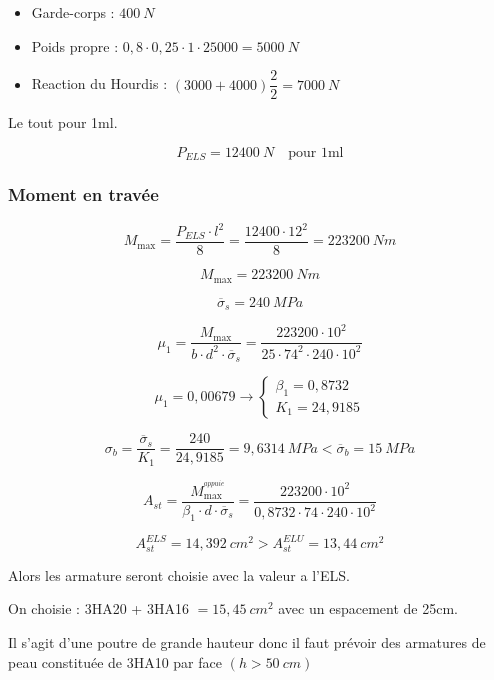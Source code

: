\documentclass[12pt,a4paper]{article}
\begin{document}
	
	\begin{itemize}
		\item Garde-corps : $400 ~\unit{N}$
		\item Poids propre : $0,8 \cdot 0,25 \cdot 1 \cdot 25000 = 5000 ~\unit{N}$
		\item Reaction du Hourdis : $(3000 + 4000)\dfrac{2}{2} = 7000 ~\unit{N}$
	\end{itemize}
	
	Le tout pour 1ml.
	
	\[ P_{ELS} = 12400 ~\unit{N} \quad\text{pour 1ml} \]
	
	
	\subsubsection{Moment en travée}
	
	\[ M_{\max} = \dfrac{P_{ELS} \cdot l^{2}}{8} = \dfrac{12400 \cdot 12^{2}}{8} = 223200 ~\unit{Nm} \]
	
	\[ M_{\max} = 223200 ~\unit{Nm} \]
	
	\[ \overline{\sigma}_{s} = 240 ~\unit{MPa} \]
	
	
	
	\vspace{\baselineskip}
	
	
	\[ \mu_{1} = \dfrac{M_{\max}}{b \cdot d^{2} \cdot \overline{\sigma}_{s}} = \dfrac{223200 \cdot 10^{2}}{25 \cdot 74^{2} \cdot 240 \cdot 10^{2}} \]
	
	\[ \mu_{1} = 0,00679 \rightarrow \begin{cases}
		\beta_{1} = 0,8732 \\
		K_{1} = 24,9185
	\end{cases} \]
	
	
	\[ \sigma_{b} = \dfrac{\overline{\sigma}_{s}}{K_{1}} = \dfrac{240}{24,9185} = 9,6314 ~\unit{MPa} < \overline{\sigma}_{b} = 15 ~\unit{MPa} \]
	
	\[ A_{st} = \dfrac{M_{\max}^{^{appuie}}}{\beta_{1} \cdot d \cdot \overline{\sigma}_{s}} = \dfrac{223200 \cdot 10^{2}}{0,8732 \cdot 74 \cdot 240 \cdot 10^{2}} \]
	
	
	\[ A_{st}^{ELS} = 14,392 ~\unit{cm^{2}} > A_{st}^{ELU} = 13,44 ~\unit{cm^{2}} \]
	
	
	Alors les armature seront choisie avec la valeur a l'ELS.
	
	On choisie : 3HA20 + 3HA16 $= 15,45 ~\unit{cm^{2}}$ avec un espacement de 25cm.
	
	
	\begin{tcolorbox}[colback=gray!20, colframe=black, title=Remarque]
		Il s'agit d'une poutre de grande hauteur donc il faut prévoir des armatures de peau constituée de 3HA10 par face $(h > 50 ~\unit{cm})$ 
	\end{tcolorbox}
	
\end{document}
